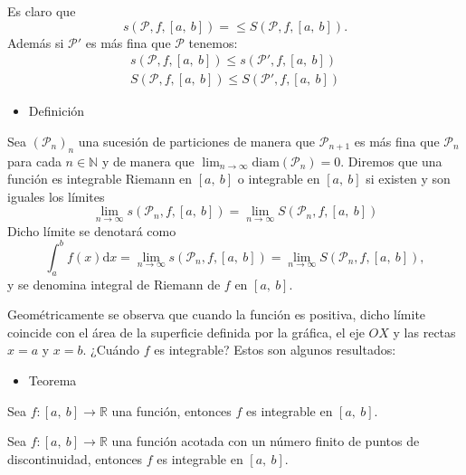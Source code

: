 Es claro que \[ s(\mathcal{P},f,[a,~b]) =\le S(\mathcal{P},f,[a,~b]).\] Además si $\mathcal{P}'$ es más fina que $\mathcal{P}$ tenemos: \[ \begin{array}{l}
	s(\mathcal{P},f,[a,~b])\le s(\mathcal{P}',f,[a,~b])\\
	S(\mathcal{P},f,[a,~b])\le S(\mathcal{P}',f,[a,~b])
\end{array} \]
\begin{itemize}[label=\color{red}\textbullet, leftmargin=*]
	\item \color{lightblue}Definición
\end{itemize}
 Sea $(\mathcal{P}_n)_n$ una sucesión de particiones de manera que $\mathcal{P}_{n+1}$ es más fina que $\mathcal{P}_n$ para cada $n\in\mathbb{N}$ y de manera que $\lim_{n\to\infty}\mathrm{diam}(\mathcal{P}_n)=0$. Diremos que una función es integrable Riemann en $[a,~b]$ o integrable en $[a,~b]$ si existen y son iguales los límites \[ \lim_{n\to\infty}s(\mathcal{P}_n,f,[a,~b]) =\lim_{n\to\infty}S(\mathcal{P}_n,f,[a,~b])\] Dicho límite se denotará como \[ \int_{a}^{b}f(x)\mathrm{d}x=\lim_{n\to\infty}s(\mathcal{P}_n,f,[a,~b])=\lim_{n\to\infty}S(\mathcal{P}_n,f,[a,~b]) ,\] y se denomina integral de Riemann de $f$ en $[a,~b]$.

Geométricamente se observa que cuando la función es positiva, dicho límite coincide con el área de la superficie definida por la gráfica, el eje $OX$ y las rectas $x=a$ y $x=b$. ¿Cuándo $f$ es integrable? Estos son algunos resultados:
\begin{itemize}[label=\color{red}\textbullet, leftmargin=*]
	\item \color{lightblue}Teorema
\end{itemize}
Sea $f:[a,~b]\rightarrow\mathbb{R}$ una función, entonces $f$ es integrable en $[a,~b]$.

Sea $f:[a,~b]\rightarrow\mathbb{R}$ una función acotada con un número finito de puntos de discontinuidad, entonces $f$ es integrable en $[a,~b]$.
